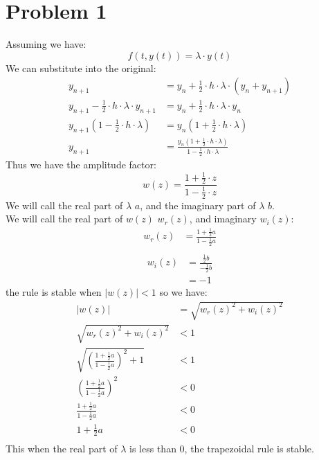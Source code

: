 \documentclass{article}
\title{\thetitle}
\author{\theauthor}
\begin{document}
\maketitle
\section* {Problem 1}
Assuming we have: \\
\[
f(t, y(t)) = \lambda \cdot y(t)
\]
We can substitute into the original: \\
\begin{align*}
y_{n+1} &= y_n + \frac{1}{2} \cdot h \cdot \lambda \cdot (y_n + y_{n+1})\\ 
y_{n+1} - \frac{1}{2} \cdot h \cdot \lambda \cdot y_{n+1} &= y_n + \frac{1}{2} \cdot h \cdot \lambda \cdot y_n \\
y_{n+1}(1 - \frac{1}{2} \cdot h \cdot \lambda) &= y_n(1 + \frac{1}{2} \cdot h \cdot \lambda) \\
y_{n+1} &= \frac{y_n(1 + \frac{1}{2} \cdot h \cdot \lambda)}{1 - \frac{1}{2} \cdot h \cdot \lambda}
\end{align*}
Thus we have the amplitude factor: \\
\[
w(z) = \frac{1 + \frac{1}{2} \cdot z}{1 - \frac{1}{2} \cdot z}
\]
We will call the real part of $\lambda$ $a$, and the imaginary part of $\lambda$ $b$. \\
We will call the real part of $w(z)$ $w_r(z)$, and imaginary $w_i(z)$: \\
\begin{align*}
w_r(z) &= \frac{1 + \frac{1}{2}a}{1 - \frac{1}{2}a} \\
\end{align*}
\begin{align*}
w_i(z) &= \frac{\frac{1}{2}b}{-\frac{1}{2}b} \\
&= -1
\end{align*}
the rule is stable when $|w(z)| < 1$ so we have: \\
\begin{align*}
|w(z)| &= \sqrt{w_r(z)^2 + w_i(z)^2} \\
\sqrt{w_r(z)^2 + w_i(z)^2} &< 1 \\
\sqrt{(\frac{1 + \frac{1}{2}a}{1 - \frac{1}{2}a})^2 + 1} &< 1 \\
(\frac{1 + \frac{1}{2}a}{1 - \frac{1}{2}a})^2 &< 0 \\
\frac{1 + \frac{1}{2}a}{1 - \frac{1}{2}a} &<0 \\
1 + \frac{1}{2}a &< 0\\
\end{align*}
This when the real part of $\lambda$ is less than 0, the trapezoidal rule is stable. \\
\end{document}
